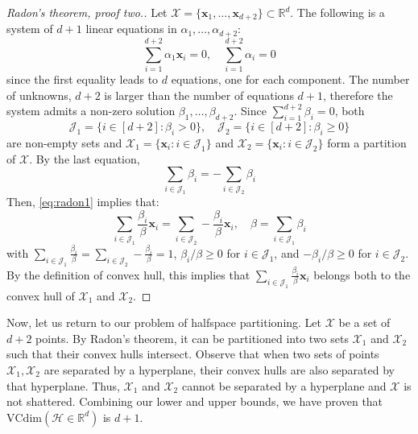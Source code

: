 \begin{proof}[Radon's theorem, proof two.]
    Let $\mathcal{X}=\{\mathbf{x}_{1},\dots,\mathbf{x}_{d+2}\}\subset \mathbb{R}^{d}$. The following is a system of $d+1$ linear equations in $\alpha_{1},\dots,\alpha_{d+2}$: 
    \begin{equation}
        \sum^{d+2}_{i=1}\alpha_{1}\mathbf{x}_{i}=0, \quad \sum^{d+2}_{i=1} \alpha_{i} = 0
        \label{eq:radon1}
    \end{equation} 
    since the first equality leads to $d$ equations, one for each component. The number of unknowns, $d+2$ is larger than the number of equations $d+1$, therefore the system admits a non-zero solution $\beta_{1},\dots,\beta_{d+2}$. Since $\sum^{d+2}_{i=1}\beta_{i}=0$, both 
    \begin{equation}
        \mathcal{J}_{1} = \{i\in [d+2]: \beta_{i}>0\}, \quad \mathcal{J}_{2} = \{i \in [d+2]: \beta_{i}\geq 0\}
    \end{equation}
    are non-empty sets and $\mathcal{X}_{1}=\{\mathbf{x}_{i}: i \in \mathcal{J}_{1}\}$ and $\mathcal{X}_{2}=\{\mathbf{x}_{i}:i\in \mathcal{J}_{2}\}$ form a partition of $\mathcal{X}$. By the last equation, 
    \begin{equation}
        \sum_{i\in \mathcal{J}_{1}}\beta_{i} = - \sum_{i\in \mathcal{J}_{2}} \beta_{i}
    \end{equation}
    Then, \ref{eq:radon1} implies that: 
    \begin{equation}
        \sum_{i\in \mathcal{J}_{1}} \frac{\beta_{i}}{\beta} \mathbf{x}_{i} = \sum_{i\in \mathcal{J}_{2}} - \frac{\beta_{i}}{\beta} \mathbf{x}_{i}, \quad \beta = \sum_{i\in \mathcal{J}_{1}} \beta_{i}
    \end{equation}
    with $\sum_{i\in \mathcal{J}_{1}} \frac{\beta_{i}}{\beta}  = \sum_{i\in \mathcal{J}_{2}} - \frac{\beta_{i}}{\beta} =1$, $\beta_{i}/\beta \geq 0$ for $i\in \mathcal{J}_{1}$, and $-\beta_{i}/\beta \geq 0$ for $i\in \mathcal{J}_{2}$. By the definition of convex hull, this implies that $\sum_{i\in \mathcal{J}_{1}} \frac{\beta_{i}}{\beta} \mathbf{x}_{i}$ belongs both to the convex hull of $\mathcal{X}_{1}$ and $\mathcal{X}_{2}$. 
\end{proof}
Now, let us return to our problem of halfspace partitioning. Let $\mathcal{X}$ be a set of $d+2$ points. By Radon's theorem, it can be partitioned into two sets $\mathcal{X}_{1}$ and $\mathcal{X}_{2}$ such that their convex hulls intersect. Observe that when two sets of points $\mathcal{X}_{1},\mathcal{X}_{2}$ are separated by a hyperplane, their convex hulls are also separated by that hyperplane. Thus, $\mathcal{X}_{1}$ and $\mathcal{X}_{2}$ cannot be separated by a hyperplane and $\mathcal{X}$ is not shattered. Combining our lower and upper bounds, we have proven that $\mathrm{VCdim}(\mathcal{H}\in \mathbb{R}^{d})$ is $d+1$. 

